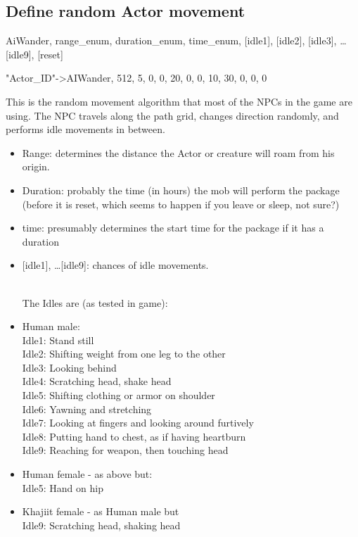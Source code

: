 \documentclass[
]{article}
\begin{document}
\hypertarget{define-random-actor-movement}{%
\subsection{Define random Actor
movement}\label{define-random-actor-movement}}

AiWander, range\_enum, duration\_enum, time\_enum, {[}idle1{]},
{[}idle2{]}, {[}idle3{]}, \ldots{[}idle9{]}, {[}reset{]}

"Actor\_ID"-\textgreater AIWander, 512, 5, 0, 0, 20, 0, 0, 10, 30, 0, 0,
0

This is the random movement algorithm that most of the NPCs in the game
are using. The NPC travels along the path grid, changes direction
randomly, and performs idle movements in between.

\begin{itemize}
\item
  Range: determines the distance the Actor or creature will roam from
  his origin.
\item
  Duration: probably the time (in hours) the mob will perform the
  package (before it is reset, which seems to happen if you leave or
  sleep, not sure?)
\item
  time: presumably determines the start time for the package if it has a
  duration
\item
  {[}idle1{]}, \ldots{[}idle9{]}: chances of idle movements.\\
  \strut \\
  The Idles are (as tested in game):
\item
  Human male:\\
  Idle1: Stand still\\
  Idle2: Shifting weight from one leg to the other\\
  Idle3: Looking behind\\
  Idle4: Scratching head, shake head\\
  Idle5: Shifting clothing or armor on shoulder\\
  Idle6: Yawning and stretching\\
  Idle7: Looking at fingers and looking around furtively\\
  Idle8: Putting hand to chest, as if having heartburn\\
  Idle9: Reaching for weapon, then touching head
\item
  Human female - as above but:\\
  Idle5: Hand on hip
\item
  Khajiit female - as Human male but\\
  Idle9: Scratching head, shaking head
\end{itemize}
\end{document}
